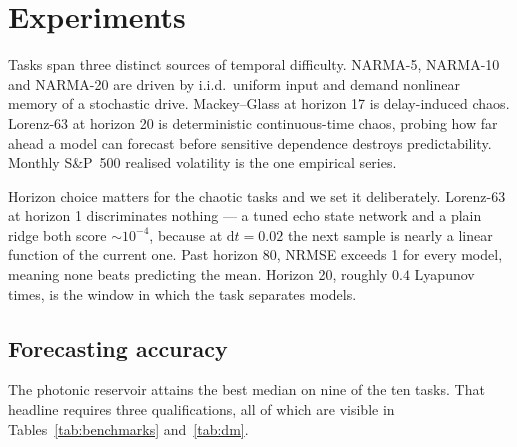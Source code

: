 \documentclass[11pt]{article}
\begin{document}
\section{Experiments}\label{sec:experiments}

Tasks span three distinct sources of temporal difficulty. NARMA-5, NARMA-10 and NARMA-20
\citep{jaeger2001esn} are driven by i.i.d.\ uniform input and demand nonlinear memory of a
stochastic drive. Mackey--Glass at horizon 17 is delay-induced chaos. Lorenz-63 at horizon 20
is deterministic continuous-time chaos, probing how far ahead a model can forecast before
sensitive dependence destroys predictability. Monthly S\&P~500 realised volatility
\citep{corsi2009} is the one empirical series.

Horizon choice matters for the chaotic tasks and we set it deliberately. Lorenz-63 at horizon
1 discriminates nothing --- a tuned echo state network and a plain ridge both score
$\sim\!10^{-4}$, because at $\mathrm{d}t = 0.02$ the next sample is nearly a linear function
of the current one. Past horizon 80, NRMSE exceeds 1 for every model, meaning none beats
predicting the mean. Horizon 20, roughly $0.4$ Lyapunov times, is the window in which the
task separates models.

\subsection{Forecasting accuracy}\label{sec:accuracy}

\begin{table}[H]\centering
  \PaperTableBenchmarks
  \caption{NRMSE, median (interquartile range) over 5 seeds, standard input-driven protocol.
           Lower is better; best per column in bold. Medians rather than means because the
           seed distribution on the chaotic tasks is heavy-tailed: one unlucky Lorenz-63
           trajectory raises a model's mean to $3.5\times$ its median and would decide the
           ranking on a single draw.}
  \label{tab:benchmarks}
\end{table}

\begin{table}[H]\centering
  \PaperTableDM
  \caption{Diebold--Mariano $p$-values with Newey--West HAC variance, each baseline against
           the recurrent photonic model.}
  \label{tab:dm}
\end{table}

The photonic reservoir attains the best median on nine of the ten tasks. That headline
requires three qualifications, all of which are visible in Tables~\ref{tab:benchmarks}
and~\ref{tab:dm}.
\end{document}

